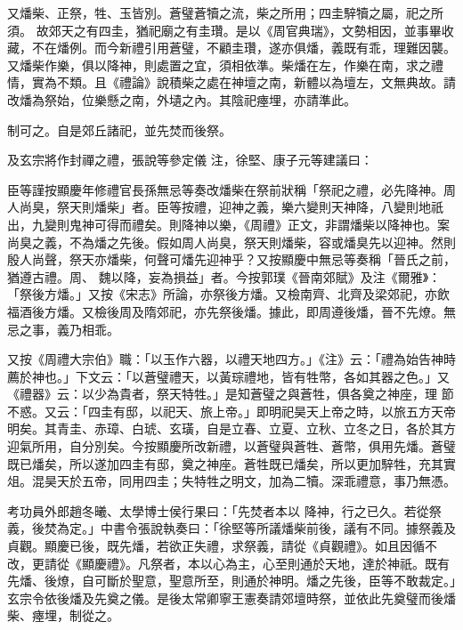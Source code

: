 \begin{pinyinscope}
 又燔柴、正祭，牲、玉皆別。蒼璧蒼犢之流，柴之所用；四圭騂犢之屬，祀之所須。
 故郊天之有四圭，猶祀廟之有圭瓚。是以《周官典瑞》，文勢相因，並事畢收藏，不在燔例。而今新禮引用蒼璧，不顧圭瓚，遂亦俱燔，義既有乖，理難因襲。又燔柴作樂，俱以降神，則處置之宜，須相依準。柴燔在左，作樂在南，求之禮情，實為不類。且《禮論》說積柴之處在神壇之南，新體以為壇左，文無典故。請改燔為祭始，位樂懸之南，外壝之內。其陰祀瘞埋，亦請準此。



 制可之。自是郊丘諸祀，並先焚而後祭。



 及玄宗將作封禪之禮，張說等參定儀
 注，徐堅、康子元等建議曰：



 臣等謹按顯慶年修禮官長孫無忌等奏改燔柴在祭前狀稱「祭祀之禮，必先降神。周人尚臭，祭天則燔柴」者。臣等按禮，迎神之義，樂六變則天神降，八變則地祇出，九變則鬼神可得而禮矣。則降神以樂，《周禮》正文，非謂燔柴以降神也。案尚臭之義，不為燔之先後。假如周人尚臭，祭天則燔柴，容或燔臭先以迎神。然則殷人尚聲，祭天亦燔柴，何聲可燔先迎神乎？又按顯慶中無忌等奏稱「晉氏之前，猶遵古禮。周、
 魏以降，妄為損益」者。今按郭璞《晉南郊賦》及注《爾雅》：「祭後方燔。」又按《宋志》所論，亦祭後方燔。又檢南齊、北齊及梁郊祀，亦飲福酒後方燔。又檢後周及隋郊祀，亦先祭後燔。據此，即周遵後燔，晉不先燎。無忌之事，義乃相乖。



 又按《周禮大宗伯》職：「以玉作六器，以禮天地四方。」《注》云：「禮為始告神時薦於神也。」下文云：「以蒼璧禮天，以黃琮禮地，皆有牲幣，各如其器之色。」又《禮器》云：以少為貴者，祭天特牲。」是知蒼璧之與蒼牲，俱各奠之神座，理
 節不惑。又云：「四圭有邸，以祀天、旅上帝。」即明祀昊天上帝之時，以旅五方天帝明矣。其青圭、赤璋、白琥、玄璜，自是立春、立夏、立秋、立冬之日，各於其方迎氣所用，自分別矣。今按顯慶所改新禮，以蒼璧與蒼牲、蒼幣，俱用先燔。蒼璧既已燔矣，所以遂加四圭有邸，奠之神座。蒼牲既已燔矣，所以更加騂牲，充其實俎。混昊天於五帝，同用四圭；失特牲之明文，加為二犢。深乖禮意，事乃無憑。



 考功員外郎趙冬曦、太學博士侯行果曰：「先焚者本以
 降神，行之已久。若從祭義，後焚為定。」中書令張說執奏曰：「徐堅等所議燔柴前後，議有不同。據祭義及貞觀。顯慶已後，既先燔，若欲正失禮，求祭義，請從《貞觀禮》。如且因循不改，更請從《顯慶禮》。凡祭者，本以心為主，心至則通於天地，達於神祇。既有先燔、後燎，自可斷於聖意，聖意所至，則通於神明。燔之先後，臣等不敢裁定。」玄宗令依後燔及先奠之儀。是後太常卿寧王憲奏請郊壇時祭，並依此先奠璧而後燔柴、瘞埋，制從之。




\end{pinyinscope}

